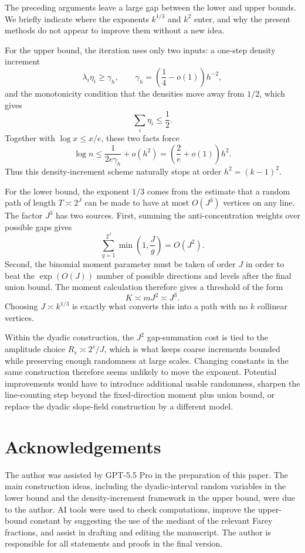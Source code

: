 \documentclass[11pt]{article}
\theoremstyle{definition}
\theoremstyle{remark}
\newcommand{\1}{\mathbf 1}
\begin{document}
The preceding arguments leave a large gap between the lower and upper bounds.  We briefly indicate where the exponents $k^{1/3}$ and $k^2$ enter, and why the present methods do not appear to improve them without a new idea.

\bigskip
\noindent
For the upper bound, the iteration uses only two inputs: a one-step density increment
\[
\lambda_i\eta_i\ge \gamma_h,
\qquad
\gamma_h=\left(\frac14-o(1)\right)h^{-2},
\]
and the monotonicity condition that the densities move away from $1/2$, which gives
\[
\sum_i \eta_i\le \frac12.
\]
Together with $\log x\le x/e$, these two facts force
\[
\log n\le \frac{1}{2e\gamma_h}+o(h^2)
=\left(\frac2e+o(1)\right)h^2.
\]
Thus this density-increment scheme naturally stops at order $h^2=(k-1)^2$.  

\bigskip
\noindent
For the lower bound, the exponent $1/3$ comes from the estimate that a random path of length $T\asymp2^J$ can be made to have at most $O(J^3)$ vertices on any line.  The factor $J^3$ has two sources.  First, summing the anti-concentration weights over possible gaps gives
\[
\sum_{g=1}^{2^J}\min\left(1,\frac{J}{g}\right)=O(J^2).
\]
Second, the binomial moment parameter must be taken of order $J$ in order to beat the $\exp(O(J))$ number of possible directions and levels after the final union bound.  The moment calculation therefore gives a threshold of the form
\[
K\asymp mJ^2\asymp J^3.
\]
Choosing $J\asymp k^{1/3}$ is exactly what converts this into a path with no $k$ collinear vertices.

\bigskip
\noindent
Within the dyadic construction, the $J^2$ gap-summation cost is tied to the amplitude choice $R_s\asymp 2^s/J$, which is what keeps coarse increments bounded while preserving enough randomness at large scales.  Changing constants in the same construction therefore seems unlikely to move the exponent.  Potential improvements would have to introduce additional usable randomness, sharpen the line-counting step beyond the fixed-direction moment plus union bound, or replace the dyadic slope-field construction by a different model.

\section*{Acknowledgements}
The author was assisted by GPT-5.5 Pro in the preparation of this paper. The main construction ideas, including the dyadic-interval random variables in the lower bound and the density-increment framework in the upper bound, were due to the author. AI tools were used to check computations, improve the upper-bound constant by suggesting the use of the mediant of the relevant Farey fractions, and assist in drafting and editing the manuscript. The author is responsible for all statements and proofs in the final version.
\end{document}
